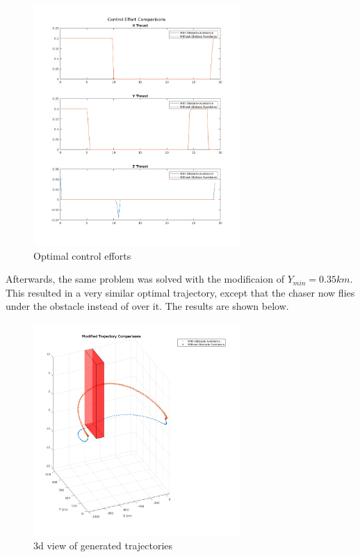 \documentclass{article}
\begin{document}
\begin{figure}[H]
  \centering
  \includegraphics[width=0.7\textwidth]{images/control.png}
  \caption{Optimal control efforts}
  \label{fig:controls}
\end{figure}

Afterwards, the same problem was solved with the modificaion of $Y_{min} = 0.35km$.
This resulted in a very similar optimal trajectory, except that the chaser now flies under the obstacle instead of over it.
The results are shown below.

\begin{figure}[H]
  \centering
  \includegraphics[width=0.7\textwidth]{images/traj_mod.png}
  \caption{3d view of generated trajectories}
  \label{fig:trajectories-modified}
\end{figure}
\end{document}
